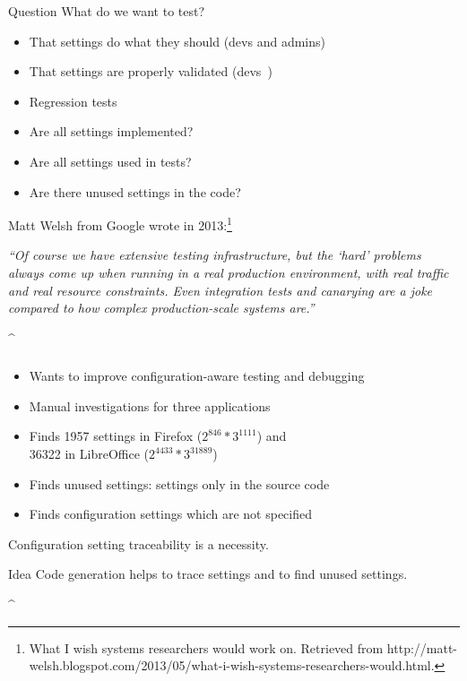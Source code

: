 \begin{frame}
	\begin{alertblock}{Question}
	What do we want to test?
	\end{alertblock}

	\pause
	\begin{itemize}
	\item That settings do what they should (devs and admins)
	\item That settings are properly validated (devs~\cite{xu2013blame})
	\item Regression tests~\cite{qu2008configuration}
	\pause
	\vspace{1em}
	\item Are all settings implemented?
	\item Are all settings used in tests?
	\item Are there unused settings in the code?
	\end{itemize}
\end{frame}

\begin{frame}
	Matt Welsh from Google wrote in 2013:\footnote{What I wish systems researchers would work on. Retrieved from http://matt-welsh.blogspot.com/2013/05/what-i-wish-systems-researchers-would.html.}

	\vspace{2em}

	\emph{``Of course we have extensive testing infrastructure, but the ‘hard’ problems always
	come up when running in a real production environment, with real traffic and real
	resource constraints. Even integration tests and canarying are a joke compared to
	how complex production-scale systems are.''}
\end{frame}

\lstDeleteShortInline^
\begin{frame}
	\frametitle{\citet{jin2014configurations}}

	\begin{itemize}
	\item Wants to improve configuration-aware testing and debugging
	\item Manual investigations for three applications
	\item Finds 1957 settings in Firefox ($2^{846} * 3^{1111}$) and \\
		36322 in LibreOffice ($2^{4433} * 3^{31889}$)
	\item Finds unused settings: settings only in the source code
	\item Finds configuration settings which are not specified
	\end{itemize}

	\begin{requirement}
	Configuration setting traceability is a necessity.
	\end{requirement}

	\begin{alertblock}{Idea}
	Code generation helps to trace settings and to find unused settings.
	\end{alertblock}
\end{frame}
\lstMakeShortInline[postbreak=,keywordstyle={},showspaces=no]^

